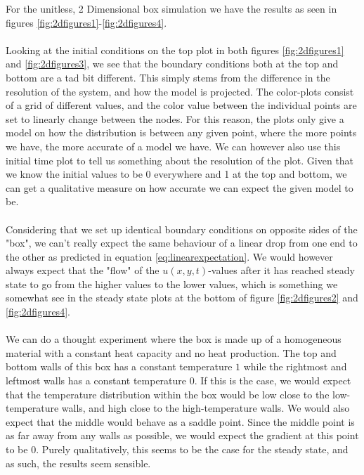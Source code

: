 \documentclass[reprint,english,notitlepage]{revtex4-1}  %
\begin{document}
For the unitless, 2 Dimensional box simulation we have the results as seen in figures \ref{fig:2dfigures1}-\ref{fig:2dfigures4}.
\\
\\
Looking at the initial conditions on the top plot in both figures \ref{fig:2dfigures1} and \ref{fig:2dfigures3}, we see that the boundary conditions both at the top and bottom are a tad bit different. This simply stems from the difference in the resolution of the system, and how the model is projected. The color-plots consist of a grid of different values, and the color value between the individual points are set to linearly change between the nodes. For this reason, the plots only give a model on how the distribution is between any given point, where the more points we have, the more accurate of a model we have. We can however also use this initial time plot to tell us something about the resolution of the plot. Given that we know the initial values to be 0 everywhere and 1 at the top and bottom, we can get a qualitative measure on how accurate we can expect the given model to be.
\\
\\
Considering that we set up identical boundary conditions on opposite sides of the "box", we can't really expect the same behaviour of a linear drop from one end to the other as predicted in equation \ref{eq:linearexpectation}. We would however always expect that the "flow" of the $u(x,y,t)$-values after it has reached steady state to go from the higher values to the lower values, which is something we somewhat see in the steady state plots at the bottom of figure \ref{fig:2dfigures2} and \ref{fig:2dfigures4}. 
\\
\\
We can do a thought experiment where the box is made up of a homogeneous material with a constant heat capacity and no heat production. The top and bottom walls of this box has a constant temperature $1$ while the rightmost and leftmost walls has a constant temperature $0$. If this is the case, we would expect that the temperature distribution within the box would be low close to the low-temperature walls, and high close to the high-temperature walls. We would also expect that the middle would behave as a saddle point. Since the middle point is as far away from any walls as possible, we would expect the gradient at this point to be 0. Purely qualitatively, this seems to be the case for the steady state, and as such, the results seem sensible.
\\
\\
\end{document}
